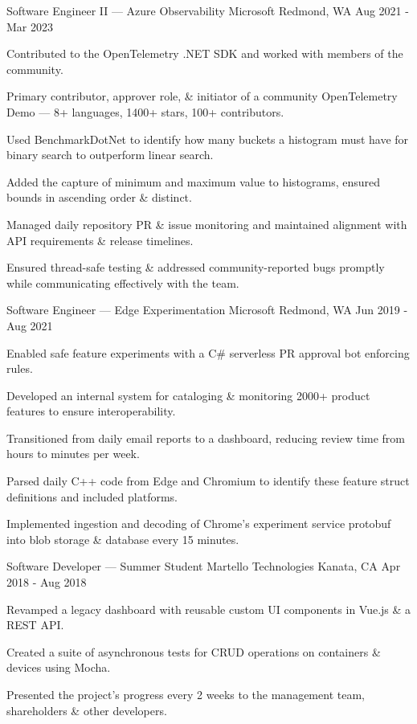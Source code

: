
\begin{cventries}
	\cventry
		{Software Engineer II --- Azure Observability}
		{Microsoft}
		{Redmond, WA}
		{Aug 2021 - Mar 2023}
		{\begin{cvitems}
			\item Contributed to the OpenTelemetry .NET SDK and worked with members of the community.
			\item Primary contributor, approver role, \& initiator of a community OpenTelemetry Demo --- 8+ languages, 1400+ stars, 100+ contributors.
			\item Used BenchmarkDotNet to identify how many buckets a histogram must have for binary search to outperform linear search.
			\item Added the capture of minimum and maximum value to histograms, ensured bounds in ascending order \& distinct.
			\item Managed daily repository PR \& issue monitoring and maintained alignment with API requirements \& release timelines.
			\item Ensured thread-safe testing \& addressed community-reported bugs promptly while communicating effectively with the team.
		\end{cvitems}}
		
	\cventry
		{Software Engineer --- Edge Experimentation}
		{Microsoft}
		{Redmond, WA}
		{Jun 2019 - Aug 2021}
		{\begin{cvitems}
			\item Enabled safe feature experiments with a C\# serverless PR approval bot enforcing rules.
			\item Developed an internal system for cataloging \& monitoring 2000+ product features to ensure interoperability.
			\item Transitioned from daily email reports to a dashboard, reducing review time from hours to minutes per week.
			\item Parsed daily C++ code from Edge and Chromium to identify these feature struct definitions and included platforms.
			\item Implemented ingestion and decoding of Chrome's experiment service protobuf into blob storage \& database every 15 minutes.
		\end{cvitems}}

	\cventry
		{Software Developer --- Summer Student}
		{Martello Technologies}
		{Kanata, CA}
		{Apr 2018 - Aug 2018}
		{\begin{cvitems}
			\item Revamped a legacy dashboard with reusable custom UI components in Vue.js \& a REST API.
			\item Created a suite of asynchronous tests for CRUD operations on containers \& devices using Mocha.
			\item Presented the project's progress every 2 weeks to the management team, shareholders \& other developers.
		\end{cvitems}}


\end{cventries}
